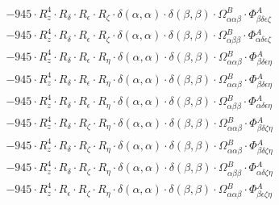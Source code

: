 \documentclass{article}
\begin{document}
\begin{subequations}
\begin{gather}
\begin{array}{c}
 \\[0.2em] 		 - 945 \cdot R_{z}^{4} \cdot R_{\delta{}} \cdot R_{\epsilon{}} \cdot R_{\zeta{}} \cdot \delta{}\left(\alpha{}, \alpha{}\right) \cdot \delta{}\left(\beta{}, \beta{}\right) \cdot \Omega{}^{B}_{\alpha{}\alpha{}\beta{}} \cdot \Phi{}^{A}_{\beta{}\delta{}\epsilon{}\zeta{}} 
 \\[0.2em] 		 - 945 \cdot R_{z}^{4} \cdot R_{\delta{}} \cdot R_{\epsilon{}} \cdot R_{\zeta{}} \cdot \delta{}\left(\alpha{}, \alpha{}\right) \cdot \delta{}\left(\beta{}, \beta{}\right) \cdot \Omega{}^{B}_{\alpha{}\beta{}\beta{}} \cdot \Phi{}^{A}_{\alpha{}\delta{}\epsilon{}\zeta{}} 
 \\[0.2em] 		 - 945 \cdot R_{z}^{4} \cdot R_{\delta{}} \cdot R_{\epsilon{}} \cdot R_{\eta{}} \cdot \delta{}\left(\alpha{}, \alpha{}\right) \cdot \delta{}\left(\beta{}, \beta{}\right) \cdot \Omega{}^{B}_{\alpha{}\alpha{}\beta{}} \cdot \Phi{}^{A}_{\beta{}\delta{}\epsilon{}\eta{}} 
 \\[0.2em] 		 - 945 \cdot R_{z}^{4} \cdot R_{\delta{}} \cdot R_{\epsilon{}} \cdot R_{\eta{}} \cdot \delta{}\left(\alpha{}, \alpha{}\right) \cdot \delta{}\left(\beta{}, \beta{}\right) \cdot \Omega{}^{B}_{\alpha{}\alpha{}\beta{}} \cdot \Phi{}^{A}_{\beta{}\delta{}\epsilon{}\eta{}} 
 \\[0.2em] 		 - 945 \cdot R_{z}^{4} \cdot R_{\delta{}} \cdot R_{\epsilon{}} \cdot R_{\eta{}} \cdot \delta{}\left(\alpha{}, \alpha{}\right) \cdot \delta{}\left(\beta{}, \beta{}\right) \cdot \Omega{}^{B}_{\alpha{}\beta{}\beta{}} \cdot \Phi{}^{A}_{\alpha{}\delta{}\epsilon{}\eta{}} 
 \\[0.2em] 		 - 945 \cdot R_{z}^{4} \cdot R_{\delta{}} \cdot R_{\zeta{}} \cdot R_{\eta{}} \cdot \delta{}\left(\alpha{}, \alpha{}\right) \cdot \delta{}\left(\beta{}, \beta{}\right) \cdot \Omega{}^{B}_{\alpha{}\alpha{}\beta{}} \cdot \Phi{}^{A}_{\beta{}\delta{}\zeta{}\eta{}} 
 \\[0.2em] 		 - 945 \cdot R_{z}^{4} \cdot R_{\delta{}} \cdot R_{\zeta{}} \cdot R_{\eta{}} \cdot \delta{}\left(\alpha{}, \alpha{}\right) \cdot \delta{}\left(\beta{}, \beta{}\right) \cdot \Omega{}^{B}_{\alpha{}\alpha{}\beta{}} \cdot \Phi{}^{A}_{\beta{}\delta{}\zeta{}\eta{}} 
 \\[0.2em] 		 - 945 \cdot R_{z}^{4} \cdot R_{\delta{}} \cdot R_{\zeta{}} \cdot R_{\eta{}} \cdot \delta{}\left(\alpha{}, \alpha{}\right) \cdot \delta{}\left(\beta{}, \beta{}\right) \cdot \Omega{}^{B}_{\alpha{}\beta{}\beta{}} \cdot \Phi{}^{A}_{\alpha{}\delta{}\zeta{}\eta{}} 
 \\[0.2em] 		 - 945 \cdot R_{z}^{4} \cdot R_{\epsilon{}} \cdot R_{\zeta{}} \cdot R_{\eta{}} \cdot \delta{}\left(\alpha{}, \alpha{}\right) \cdot \delta{}\left(\beta{}, \beta{}\right) \cdot \Omega{}^{B}_{\alpha{}\alpha{}\beta{}} \cdot \Phi{}^{A}_{\beta{}\epsilon{}\zeta{}\eta{}} 

\end{array}
\end{gather}
\end{subequations}
\end{document}
